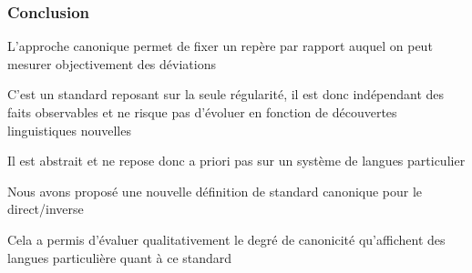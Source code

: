 
\begin{frame}
\frametitle{Conclusion}
\begin{wideitemize}%
\item[\highlightii{\lefthand}]  L'approche canonique permet de fixer
  un repère par rapport auquel on peut mesurer objectivement des déviations
\item C'est un standard reposant sur la seule régularité, il est donc
  indépendant des faits observables et ne risque pas d'évoluer en
  fonction de découvertes linguistiques nouvelles
\item Il est abstrait et ne repose donc a priori pas sur un système de
  langues particulier
\item[\highlightiv{\lefthand}] Nous avons proposé une nouvelle
  définition de standard canonique pour le direct/inverse
\item Cela a permis d'évaluer qualitativement le degré de canonicité
  qu'affichent des langues particulière quant à ce standard
\end{wideitemize}
\end{frame}


